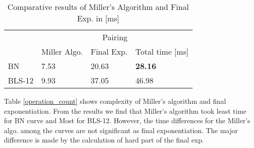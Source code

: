 \renewcommand{\baselinestretch}{1.5}
\begin{table}[htb]
\centering
\caption{Comparative results of Miller's Algorithm and Final Exp. in [ms]}
\label{result_table}
\begin{tabular}{l|l|l|l|}
\cline{2-4}
                             & \multicolumn{3}{c|}{Pairing}      \\ \cline{2-4} 
                             & Miller Algo. & Final Exp. & Total time [ms] \\ \hline
\multicolumn{1}{|l|}{BN}     & 7.53         & 20.63      &    \textbf{28.16}   \\ \hline
\multicolumn{1}{|l|}{BLS-12} & 9.93        & 37.05      &     46.98  \\ \hline
\end{tabular}
\end{table}
\renewcommand{\baselinestretch}{1.0}
Table \ref{operation_count} shows complexity of Miller's algorithm and final exponentiation. 
From the results we find that Miller's algorithm took least time for BN curve and Most for BLS-12. 
However, the time differences for the Miller's algo. among the curves are not significant as final exponentiation. The major difference is made by the calculation of hard part of the final exp. 
\renewcommand{\baselinestretch}{1.5}
